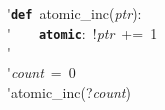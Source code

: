 \'\>\texttt{\textbf{def}}~atomic\_inc(\textit{ptr}):\\

\'\>~~~~\texttt{\textbf{atomic}}:~!\textit{ptr}~+=~1\\

\'\>~~~~\\

\'\>\textit{count}~=~0\\

\'\>atomic\_inc(?\textit{count})